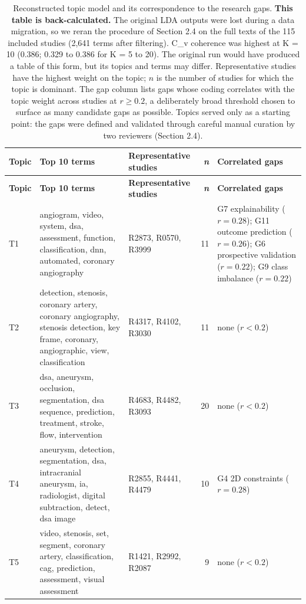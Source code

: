 \begin{longtable}{>{\raggedright\arraybackslash}p{0.7cm} >{\raggedright\arraybackslash}p{6.2cm} >{\raggedright\arraybackslash}p{2.9cm} r >{\raggedright\arraybackslash}p{4.2cm}}
\caption{Reconstructed topic model and its correspondence to the research gaps. \textbf{This table is back-calculated.} The original LDA outputs were lost during a data migration, so we reran the procedure of Section 2.4 on the full texts of the 115 included studies (2,641 terms after filtering). C\_v coherence was highest at K = 10 (0.386; 0.329 to 0.386 for K = 5 to 20). The original run would have produced a table of this form, but its topics and terms may differ. Representative studies have the highest weight on the topic; $n$ is the number of studies for which the topic is dominant. The gap column lists gaps whose coding correlates with the topic weight across studies at $r \geq 0.2$, a deliberately broad threshold chosen to surface as many candidate gaps as possible. Topics served only as a starting point: the gaps were defined and validated through careful manual curation by two reviewers (Section 2.4).}\label{tab:lda_topics}\\
\toprule
\textbf{Topic} & \textbf{Top 10 terms} & \textbf{Representative studies} & \textbf{\textit{n}} & \textbf{Correlated gaps}\\
\midrule\endfirsthead
\toprule
\textbf{Topic} & \textbf{Top 10 terms} & \textbf{Representative studies} & \textbf{\textit{n}} & \textbf{Correlated gaps}\\
\midrule\endhead
\bottomrule\endfoot
T1 & angiogram, video, system, dsa, assessment, function, classification, dnn, automated, coronary angiography & R2873, R0570, R3999 & 11 & G7 explainability ($r=0.28$); G11 outcome prediction ($r=0.26$); G6 prospective validation ($r=0.22$); G9 class imbalance ($r=0.22$)\\
T2 & detection, stenosis, coronary artery, coronary angiography, stenosis detection, key frame, coronary, angiographic, view, classification & R4317, R4102, R3030 & 11 & none ($r<0.2$)\\
T3 & dsa, aneurysm, occlusion, segmentation, dsa sequence, prediction, treatment, stroke, flow, intervention & R4683, R4482, R3093 & 20 & none ($r<0.2$)\\
T4 & aneurysm, detection, segmentation, dsa, intracranial aneurysm, ia, radiologist, digital subtraction, detect, dsa image & R2855, R4441, R4479 & 10 & G4 2D constraints ($r=0.28$)\\
T5 & video, stenosis, set, segment, coronary artery, classification, cag, prediction, assessment, visual assessment & R1421, R2992, R2087 & 9 & none ($r<0.2$)\\

\end{longtable}
